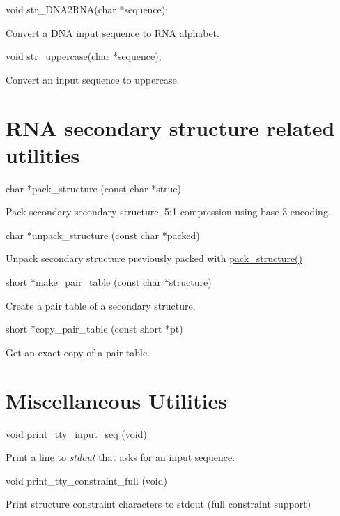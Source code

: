 \begin{DoxyVerb}void str_DNA2RNA(char *sequence);
\end{DoxyVerb}
 Convert a D\+NA input sequence to R\+NA alphabet.

\begin{DoxyVerb}void str_uppercase(char *sequence);
\end{DoxyVerb}
 Convert an input sequence to uppercase.

\hypertarget{mp_utils_utils_struc}{}\section{R\+N\+A secondary structure related utilities}\label{mp_utils_utils_struc}
\begin{DoxyVerb}char *pack_structure (const char *struc)
\end{DoxyVerb}
 Pack secondary secondary structure, 5\+:1 compression using base 3 encoding.

\begin{DoxyVerb}char *unpack_structure (const char *packed)
\end{DoxyVerb}
 Unpack secondary structure previously packed with \hyperlink{group__struct__utils_gac6dfa5e22928c087c6e09ff0054a7ced}{pack\+\_\+structure()}

\begin{DoxyVerb}short *make_pair_table (const char *structure)
\end{DoxyVerb}
 Create a pair table of a secondary structure.

\begin{DoxyVerb}short *copy_pair_table (const short *pt)
\end{DoxyVerb}
 Get an exact copy of a pair table.

\hypertarget{mp_utils_utils_misc}{}\section{Miscellaneous Utilities}\label{mp_utils_utils_misc}
\begin{DoxyVerb}void print_tty_input_seq (void)
\end{DoxyVerb}
 Print a line to {\itshape stdout} that asks for an input sequence.

\begin{DoxyVerb}void print_tty_constraint_full (void)
\end{DoxyVerb}
 Print structure constraint characters to stdout (full constraint support)

